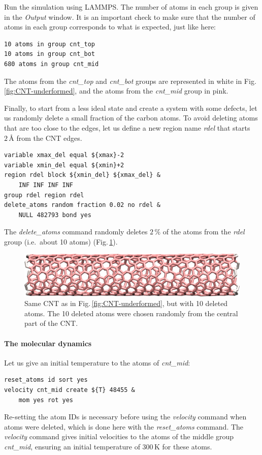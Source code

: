 \documentclass[9pt,tutorial]{livecoms}
\begin{document}
Run the simulation using LAMMPS. The number of atoms in each group is given in
the \textit{Output} window.  It is an important check to make sure that the number
of atoms in each group corresponds to what is expected, just like here:
\begin{lstlisting}
10 atoms in group cnt_top
10 atoms in group cnt_bot
680 atoms in group cnt_mid
\end{lstlisting}
The atoms from the \textit{cnt\_top} and \textit{cnt\_bot} groups are
represented in white in Fig.\,\ref{fig:CNT-underformed}, and the atoms from
the \textit{cnt\_mid} group in pink.

Finally, to start from a less ideal state and create a system with some defects,
let us randomly delete a small fraction of the carbon atoms. To avoid deleting
atoms that are too close to the edges, let us define a new region name \textit{rdel}
that starts $2\,\text{\AA{}}$ from the CNT edges.
\begin{lstlisting}
variable xmax_del equal ${xmax}-2
variable xmin_del equal ${xmin}+2
region rdel block ${xmin_del} ${xmax_del} &
    INF INF INF INF
group rdel region rdel
delete_atoms random fraction 0.02 no rdel &
    NULL 482793 bond yes
\end{lstlisting}
The \textit{delete\_atoms} command randomly deletes $2\,\%$ of the atoms from
the \textit{rdel} group (i.e.~about 10 atoms) (Fig.\,\ref{fig:CNT-underformed-deleted}).

\begin{figure}
\centering
\includegraphics[width=\linewidth]{CNT-underformed-deleted}
\caption{Same CNT as in Fig.\,\ref{fig:CNT-underformed}, but with 10 deleted atoms.
The 10 deleted atoms were chosen randomly from the central part of the CNT.}
\label{fig:CNT-underformed-deleted}
\end{figure}

\paragraph{The molecular dynamics}

Let us give an initial temperature to the atoms of \textit{cnt\_mid}:
\begin{lstlisting}
reset_atoms id sort yes
velocity cnt_mid create ${T} 48455 &
    mom yes rot yes
\end{lstlisting}
Re-setting the atom IDs is necessary before using the \textit{velocity} command
when atoms were deleted, which is done here with the \textit{reset\_atoms} command.
The \textit{velocity} command gives initial velocities to the atoms of the middle
group \textit{cnt\_mid}, ensuring an initial temperature of $300\,\text{K}$
for these atoms.
\end{document}

